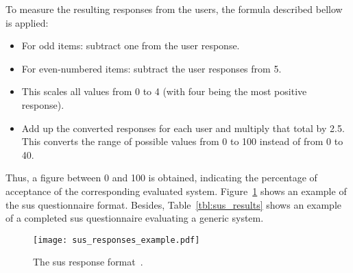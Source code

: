 To measure the resulting responses from the users, the formula described bellow
is applied: 

\begin{itemize}
 \item For odd items: subtract one from the user response.
 \item For even-numbered items: subtract the user responses from 5.
 \item This scales all values from 0 to 4 (with four being the most positive 
  response).
 \item Add up the converted responses for each user and multiply that total by 
  2.5. 
 This converts the range of possible values from 0 to 100 instead of from 0 to 
  40.
\end{itemize}

Thus, a figure between 0 and 100 is obtained, indicating the percentage of 
acceptance of the corresponding evaluated system. 
Figure~\ref{fig:sus_responses_example} shows an example of the \ac{sus} 
questionnaire format. Besides, Table~\ref{tbl:sus_results} shows an example of 
a completed \ac{sus} questionnaire evaluating a generic system. 

\begin{figure}
\centering
\texttt{[image: sus\_responses\_example.pdf]}
\caption{The \ac{sus} response format~\citep{vt100}.}
\label{fig:sus_responses_example}
\end{figure}


